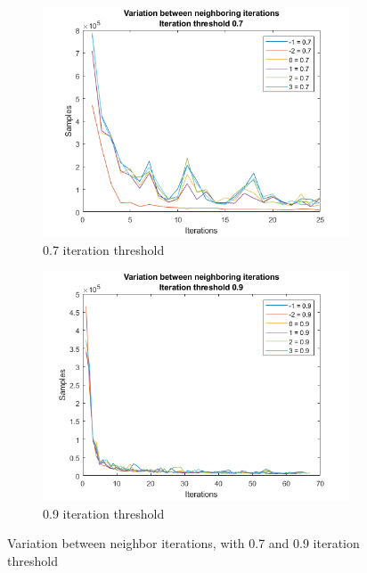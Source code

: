 \begin{figure}
    \centering
    \begin{subfigure}[b]{.49\textwidth}
        \centering
        \includegraphics[width=\textwidth]{figures/varneigh-0.7.png}
        \caption{0.7 iteration threshold}
        \label{sfig:iter:varneigh0.7}
    \end{subfigure}
    \hfill
    \begin{subfigure}[b]{.49\textwidth}
        \centering
        \includegraphics[width=\textwidth]{figures/varneigh-0.9.png}
        \caption{0.9 iteration threshold}
        \label{sfig:iter:varneigh0.9}
    \end{subfigure}
    \caption{Variation between neighbor iterations, with 0.7 and 0.9 iteration threshold}
    \label{fig:iter:varneigh0.70.9}
\end{figure}

